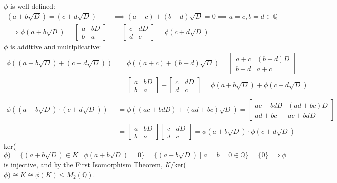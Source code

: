 $\phi$ is well-defined:
\begin{align*}
    (a + b\sqrt{D}) = (c + d\sqrt{D}) &\implies (a - c) + (b - d)\sqrt{D} = 0 \implies a = c, b = d \in \mathbb{Q} \\
    \implies \phi(a + b\sqrt{D}) = \left[\begin{array}{cc}
    a & bD  \\
    b & a 
\end{array}\right] &= \left[\begin{array}{cc}
    c & dD  \\
    d & c 
\end{array}\right] = \phi(c + d\sqrt{D})
\end{align*}
$\phi$ is additive and multiplicative:
\begin{align*}
    \phi((a + b\sqrt{D})+(c + d\sqrt{D})) &= \phi((a+c) + (b+d)\sqrt{D}) = \left[\begin{array}{cc}
    a+c & (b+d)D  \\
    b+d & a+c 
\end{array}\right] \\
&= \left[\begin{array}{cc}
    a & bD  \\
    b & a 
\end{array}\right] + \left[\begin{array}{cc}
    c & dD  \\
    d & c 
\end{array}\right] = \phi(a + b\sqrt{D}) + \phi(c + d\sqrt{D}) \\
\\
\phi((a + b\sqrt{D})\cdot(c + d\sqrt{D})) &= \phi((ac + bdD) + (ad + bc)\sqrt{D}) = \left[\begin{array}{cc}
    ac+bdD & (ad+bc)D  \\
    ad+bc & ac+bdD
\end{array}\right] \\
&= \left[\begin{array}{cc}
    a & bD  \\
    b & a 
\end{array}\right]\left[\begin{array}{cc}
    c & dD  \\
    d & c 
\end{array}\right] = \phi(a + b\sqrt{D})\cdot\phi(c + d\sqrt{D})
\end{align*}
ker($\phi) = \{(a + b\sqrt{D}) \in K \mid \phi(a + b\sqrt{D}) = 0\} = \{(a + b\sqrt{D}) \mid a = b = 0 \in \mathbb{Q}\} = \{0\} \implies \phi$ is injective, and by the First Isomorphism Theorem, $K/$ker($\phi) \cong K \cong \phi(K) \le M_2(\mathbb{Q})$.